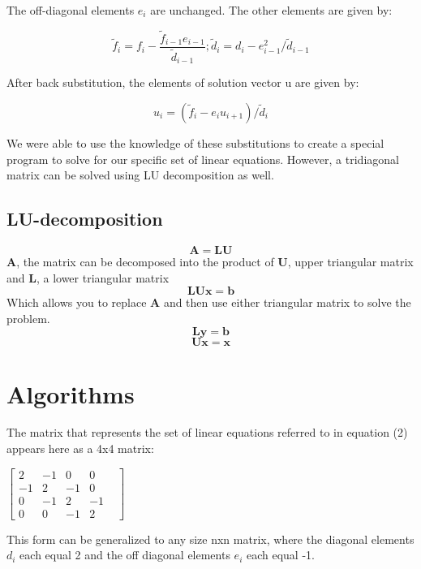 \documentclass[10pt,showpacs,preprintnumbers,footinbib,amsmath,amssymb,aps,prl,twocolumn,groupedaddress,superscriptaddress,showkeys]{revtex4-1}
\begin{document}
The off-diagonal elements $e_{i}$ are unchanged. The other elements are given by:

	\begin{equation}
	\tilde{f}_{i}=f_{i}-\frac{\tilde{f}_{i-1}e_{i-1}}{\tilde{d}_{i-1}} ; \tilde{d}_{i}=d_{i}-e^{2}_{i-1}/\tilde{d}_{i-1}
	\label{forward}
	\end{equation}
	
After back substitution, the elements of solution vector u are given by:

	\begin{equation}
	u_{i} = (\tilde{f}_{i}-e_{i}u_{i+1})/\tilde{d}_{i}
	\label{backward}
	\end{equation}

We were able to use the knowledge of these substitutions to create a special program to solve for our specific set of linear equations.  However, a tridiagonal matrix can be solved using LU decomposition as well.
	
	\subsection{LU-decomposition}
	
	\begin{equation} \mathbf{A=LU} \end{equation}
$\mathbf{A}$, the matrix can be decomposed into the product of  $\mathbf{U}$, upper triangular matrix and $\mathbf{L}$, a lower triangular matrix
	\begin{equation} \mathbf{LUx=b} \end{equation}
	Which allows you to replace $\mathbf{A}$ and then use either triangular matrix to solve the problem.
	\begin{equation} \mathbf{Ly=b} \end{equation}
	\begin{equation} \mathbf{Ux=x} \end{equation}
\section{Algorithms}	

The matrix that represents the set of linear equations referred to in equation (2) appears here as a 4x4 matrix:
\begin{center}
		$\begin{bmatrix}
			2 & -1 & 0 & 0 \\
			-1 & 2 & -1 & 0 & \\
			0 & -1 & 2 & -1   \\
			0 & 0 & -1 & 2 
		\end{bmatrix}$
		 
		\end{center}
This form can be generalized to any size nxn matrix, where the diagonal elements $d_{i}$ each equal 2 and the off diagonal elements $e_{i}$ each equal -1.
\end{document}
